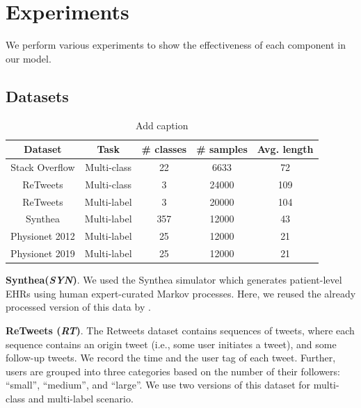 \documentclass[journal,twoside,web]{ieeecolor}
\begin{document}
\section{Experiments}
\label{sec:Experiments}

We perform various experiments to show the effectiveness of each component in our model.
\subsection*{Datasets}

\begin{table}[htbp]
    \centering
    \caption{Add caption}
      \begin{tabular}{ccccc}
      \toprule
      \toprule
      Dataset & Task  & \# classes & \# samples & Avg. length \\
      \midrule
      Stack Overflow & Multi-class & 22    & 6633  & 72 \\
      ReTweets & Multi-class & 3     & 24000 & 109 \\
      ReTweets & Multi-label & 3     & 20000 & 104 \\
      Synthea & Multi-label & 357   & 12000 & 43 \\
      Physionet 2012 & Multi-label & 25    & 12000 & 21 \\
      Physionet 2019 & Multi-label & 25    & 12000 & 21 \\
      \bottomrule
      \bottomrule
      \end{tabular}%
    \label{tab:data}%
    
  \end{table}%
  
  
  
  

\textbf{Synthea(\emph{SYN})}.
We used the Synthea simulator \cite*{walonoskiSyntheaApproachMethod2018} which generates patient-level EHRs using human expert-curated Markov processes. Here, we reused the already processed version of this data by \cite*{enguehardNeuralTemporalPoint2020}.

\textbf{ReTweets (\emph{RT})}.
The Retweets dataset contains sequences of tweets, where each sequence contains an origin tweet (i.e., some user initiates a tweet), and some follow-up tweets. We record the time and the user tag of each tweet. Further, users are grouped into three categories based on the number of their followers: “small”, “medium”, and “large”. We use two versions of this dataset for multi-class \cite*{zhangSelfAttentiveHawkesProcess2020} and multi-label \cite*{enguehardNeuralTemporalPoint2020} scenario.
\end{document}
